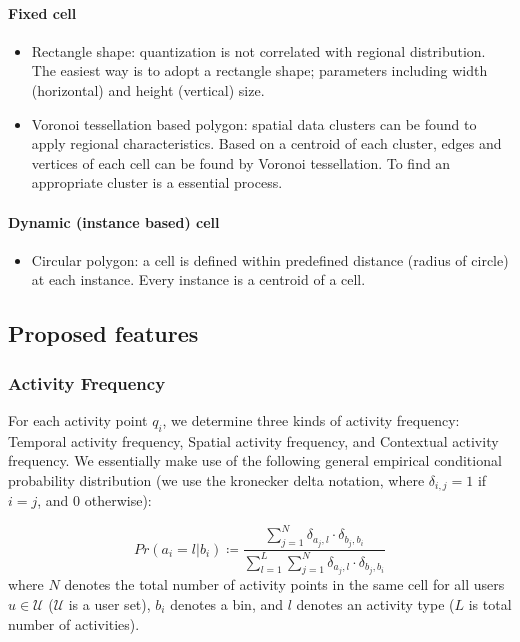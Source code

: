 \documentclass{sig-alternate}
\begin{document}
\paragraph{Fixed cell}
\begin{itemize}
\item Rectangle shape: quantization is not correlated with regional distribution. The easiest way is to adopt a rectangle shape; parameters including width (horizontal) and height (vertical) size.
\item Voronoi tessellation based polygon: spatial data clusters can be found to apply regional characteristics. Based on a centroid of each cluster, edges and vertices of each cell can be found by Voronoi tessellation. To find an appropriate cluster is a essential process.

\end{itemize}

\paragraph{Dynamic (instance based) cell}
\begin{itemize}
\item Circular polygon: a cell is defined within predefined distance (radius of circle) at each instance. Every instance is a centroid of a cell.
\end{itemize}


 \subsection{Proposed features}



\subsubsection{Activity Frequency}

For each activity point $q_i$, we determine three kinds of activity frequency: Temporal activity frequency, Spatial activity frequency, and Contextual activity frequency. We essentially make use of the following general empirical conditional probability distribution (we use the kronecker delta notation, where $\delta_{i,j}=1$ if $i=j$, and $0$ otherwise):



\begin{equation}
\label{eq:prob2}
Pr( a_i = l | b_i) \coloneqq \frac{\sum_{j=1}^N \delta_{a_j,l} \cdot \delta_{b_j,b_i}  }{\sum_{l=1}^L \sum_{j=1}^N \delta_{a_j,l} \cdot \delta_{b_j,b_i} }
\end{equation} where $N$ denotes the total number of activity points in the same cell for all users $u \in \mathcal{U}$ ($\mathcal{U}$ is a user set), $b_i$ denotes a bin, and $l$ denotes an activity type ($L$ is total number of activities).
\end{document}
